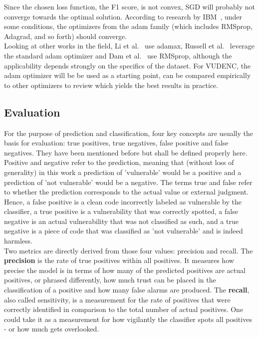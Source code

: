 \documentclass[
a4paper,
pagesize,
pdftex,
12pt,
twoside, %
BCOR=5mm, %
ngerman,
fleqn,
final,
]{scrartcl}
\begin{document}
	Since the chosen loss function, the F1 score, is not convex, SGD will probably not converge towards the optimal solution. According to research by IBM~\cite{IBMResearchEditorialStaff.6.5.2019}, under some conditions, the optimizers from the adam family (which includes RMSprop, Adagrad, and so forth) should converge.\\
	Looking at other works in the field, Li et al.~\cite{Li.2018} use adamax, Russell et al.~\cite{Russell.2018} leverage the standard adam optimizer and Dam et al.~\cite{Dam.2017} use RMSprop, although the applicability depends strongly on the specifics of the dataset. For VUDENC, the adam optimizer will be be used as a starting point, can be compared empirically to other optimizers to review which yields the best results in practice.
	
	\subsection{Evaluation}\label{Evaluation}
	For the purpose of prediction and classification, four key concepts are usually the basis for evaluation: true positives, true negatives, false positive and false negatives. They have been mentioned before but shall be defined properly here. Positive and negative refer to the prediction, meaning that (without loss of generality) in this work a prediction of 'vulnerable' would be a positive and a prediction of 'not vulnerable' would be a negative. The terms true and false refer to whether the prediction corresponds to the actual value or external judgment. Hence, a false positive is a clean code incorrectly labeled as vulnerable by the classifier, a true positive is a vulnerability that was correctly spotted, a false negative is an actual vulnerability that was not classified as such, and a true negative is a piece of code that was classified as 'not vulnerable' and is indeed harmless.\\
	Two metrics are directly derived from those four values: precision and recall. The \textbf{precision} is the rate of true positives within all positives. It measures how precise the model is in terms of how many of the predicted positives are actual positives, or phrased differently, how much trust can be placed in the classification of a positive and how many false alarms are produced. The \textbf{recall}, also called sensitivity, is a measurement for the rate of positives that were correctly identified in comparison to the total number of actual positives. One could take it as a measurement for how vigilantly the classifier spots all positives - or how much gets overlooked.\newline
\end{document}
